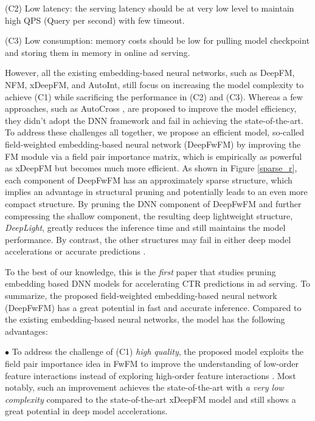 \documentclass[sigconf]{acmart}
\begin{document}
(C2) Low latency: the serving latency should be at very low level to maintain high QPS (Query per second) with few timeout.

(C3) Low consumption: memory costs should be low for pulling model checkpoint and storing them in memory in online ad serving. 

However, all the existing embedding-based neural networks, such as DeepFM, NFM, xDeepFM, and AutoInt, still focus on increasing the model complexity to achieve (C1) while sacrificing the performance in (C2) and (C3).  Whereas a few approaches, such as AutoCross \citep{autocross}, are proposed to improve the model efficiency, they didn't adopt the DNN framework and fail in achieving the state-of-the-art. To address these challenges all together, we propose an efficient model, so-called field-weighted embedding-based neural network (DeepFwFM) by improving the FM module via a field pair importance matrix, which is empirically as powerful as xDeepFM but becomes much more efficient. As shown in Figure \ref{sparse_r}, each component of DeepFwFM has an approximately sparse structure, which implies an advantage in structural pruning and potentially leads to an even more compact structure. By pruning the DNN component of DeepFwFM and further compressing the shallow component, the resulting deep lightweight structure, \emph{DeepLight}, greatly reduces the inference time and still maintains the model performance. By contrast, the other
structures may fail in either deep model accelerations \citep{NFM, deepcross, xdeepfm, autofis} or accurate predictions \citep{deepfm, deepwide, autoint}. 


To the best of our knowledge, this is the \emph{first} paper that studies pruning embedding based DNN models for accelerating CTR predictions in ad serving. To summarize, the proposed field-weighted embedding-based neural network (DeepFwFM) has a great potential in fast and accurate inference. Compared to the existing embedding-based neural networks, the model has the following advantages:

$\bullet$ To address the challenge of (C1) \emph{high quality}, the proposed model exploits the field pair importance idea in FwFM \citep{fwfm,mt-fwfm} to improve the understanding of low-order feature interactions instead of exploring high-order feature interactions \citep{deepcross, xdeepfm}. Most notably, such an improvement achieves the state-of-the-art with \emph{a very low complexity} compared to the state-of-the-art xDeepFM model and still shows a great potential in deep model accelerations.
\end{document}
